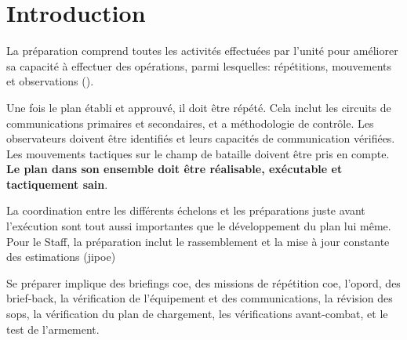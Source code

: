 \section{Introduction}

\begin{e1}
	\item La préparation comprend toutes les activités effectuées par l'unité pour améliorer sa capacité à effectuer des opérations, parmi lesquelles: répétitions, mouvements et observations ().
	\item Une fois le plan établi et approuvé, il doit être répété. Cela inclut les circuits de communications primaires et secondaires, et a méthodologie de contrôle. Les observateurs doivent être identifiés et leurs capacités de communication vérifiées. Les mouvements tactiques sur le champ de bataille doivent être pris en compte. \textbf{Le plan dans son ensemble doit être réalisable, exécutable et tactiquement sain}.
	\item La coordination entre les différents échelons et les préparations juste avant l'exécution sont tout aussi importantes que le développement du plan lui même. Pour le Staff, la préparation inclut le rassemblement et la mise à jour constante des estimations (\gls{jipoe})
	\item Se préparer implique des briefings \gls{coe}, des missions de répétition \gls{coe}, l'\gls{opord}, des brief-back, la vérification de l'équipement et des communications, la révision des \glspl{sop}, la vérification du plan de chargement, les vérifications avant-combat, et le test de l'armement.
\end{e1}

